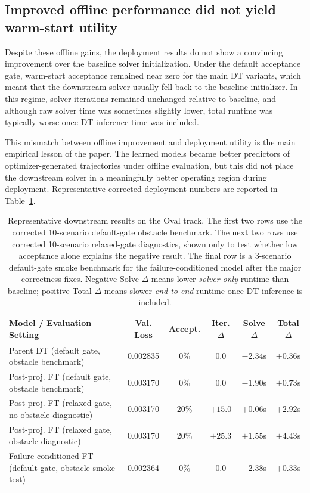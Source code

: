 \subsection{Improved offline performance did not yield warm-start utility}

Despite these offline gains, the deployment results do not show a convincing improvement over the baseline solver initialization. Under the default acceptance gate, warm-start acceptance remained near zero for the main DT variants, which meant that the downstream solver usually fell back to the baseline initializer. In this regime, solver iterations remained unchanged relative to baseline, and although raw solver time was sometimes slightly lower, total runtime was typically worse once DT inference time was included.

This mismatch between offline improvement and deployment utility is the main empirical lesson of the paper. The learned models became better predictors of optimizer-generated trajectories under offline evaluation, but this did not place the downstream solver in a meaningfully better operating region during deployment. Representative corrected deployment numbers are reported in Table~\ref{tab:headline_results}.

\begin{table}[t]
\centering
\caption{Representative downstream results on the Oval track. The first two rows use the corrected 10-scenario default-gate obstacle benchmark. The next two rows use corrected 10-scenario relaxed-gate diagnostics, shown only to test whether low acceptance alone explains the negative result. The final row is a 3-scenario default-gate smoke benchmark for the failure-conditioned model after the major correctness fixes. Negative Solve $\Delta$ means lower \emph{solver-only} runtime than baseline; positive Total $\Delta$ means slower \emph{end-to-end} runtime once DT inference is included.}
\label{tab:headline_results}
\begin{tabular}{lccccc}
\toprule
Model / Evaluation Setting & Val. Loss & Accept. & Iter. $\Delta$ & Solve $\Delta$ & Total $\Delta$ \\
\midrule
Parent DT (default gate, obstacle benchmark) & 0.002835 & 0\% & 0.0 & $-2.34$s & $+0.36$s \\
Post-proj. FT (default gate, obstacle benchmark) & 0.003170 & 0\% & 0.0 & $-1.90$s & $+0.73$s \\
Post-proj. FT (relaxed gate, no-obstacle diagnostic) & 0.003170 & 20\% & $+15.0$ & $+0.06$s & $+2.92$s \\
Post-proj. FT (relaxed gate, obstacle diagnostic) & 0.003170 & 20\% & $+25.3$ & $+1.55$s & $+4.43$s \\
Failure-conditioned FT (default gate, obstacle smoke test) & 0.002364 & 0\% & 0.0 & $-2.38$s & $+0.33$s \\
\bottomrule
\end{tabular}
\end{table}

